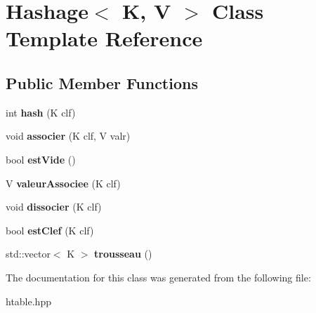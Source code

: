 \hypertarget{class_hashage}{}\section{Hashage$<$ K, V $>$ Class Template Reference}
\label{class_hashage}
\subsection*{Public Member Functions}
\begin{DoxyCompactItemize}
\item 
\hypertarget{class_hashage_a2265874505c23d17b7496f90357d2c60}{}int {\bfseries hash} (K clf)\label{class_hashage_a2265874505c23d17b7496f90357d2c60}

\item 
\hypertarget{class_hashage_a457b8998ea19cf9610d4002aae0d8f90}{}void {\bfseries associer} (K clf, V valr)\label{class_hashage_a457b8998ea19cf9610d4002aae0d8f90}

\item 
\hypertarget{class_hashage_ae45322017402c79735e264edf1e78286}{}bool {\bfseries est\+Vide} ()\label{class_hashage_ae45322017402c79735e264edf1e78286}

\item 
\hypertarget{class_hashage_a924b44e4d78250e56edbb9cbab73a521}{}V {\bfseries valeur\+Associee} (K clf)\label{class_hashage_a924b44e4d78250e56edbb9cbab73a521}

\item 
\hypertarget{class_hashage_aa7fe10ad6ec1e39fde01d9c918d0b8df}{}void {\bfseries dissocier} (K clf)\label{class_hashage_aa7fe10ad6ec1e39fde01d9c918d0b8df}

\item 
\hypertarget{class_hashage_aeb9393da0f2afdc0d6f1990c22909e59}{}bool {\bfseries est\+Clef} (K clf)\label{class_hashage_aeb9393da0f2afdc0d6f1990c22909e59}

\item 
\hypertarget{class_hashage_a90a86c0ac7dc26c154ab0d8fe6bce59a}{}std\+::vector$<$ K $>$ {\bfseries trousseau} ()\label{class_hashage_a90a86c0ac7dc26c154ab0d8fe6bce59a}

\end{DoxyCompactItemize}


The documentation for this class was generated from the following file\+:\begin{DoxyCompactItemize}
\item 
htable.\+hpp\end{DoxyCompactItemize}
